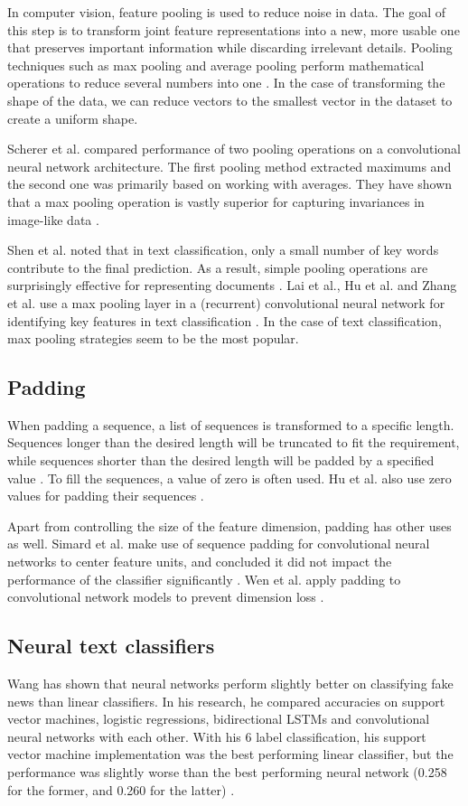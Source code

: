 In computer vision, feature pooling is used to reduce noise in data. 
The goal of this step is to transform joint feature representations into a new, more usable one that preserves important information while discarding irrelevant details. 
Pooling techniques such as max pooling and average pooling perform mathematical operations to reduce several numbers into one \cite{boureau2010}. 
In the case of transforming the shape of the data, we can reduce vectors to the smallest vector in the dataset to create a uniform shape.

Scherer et al. compared performance of two pooling operations on a convolutional neural network architecture. 
The first pooling method extracted maximums and the second one was primarily based on working with averages.
They have shown that a max pooling operation is vastly superior for capturing invariances in image-like data \cite{scherer2010}.

Shen et al. noted that in text classification, only a small number of key words contribute to the final prediction.
As a result, simple pooling operations are surprisingly effective for representing documents \cite{shen2018}.  
Lai et al., Hu et al. and Zhang et al. use a max pooling layer in a (recurrent) convolutional neural network for identifying key features in text classification \cite{lai2015}\cite{hu2014}\cite{zhang2015}. 
In the case of text classification, max pooling strategies seem to be the most popular. 

\subsection{Padding}
When padding a sequence, a list of sequences is transformed to a specific length. 
Sequences longer than the desired length will be truncated to fit the requirement, while sequences shorter than the desired length will be padded by a specified value \cite{keraspad}. 
To fill the sequences, a value of zero is often used. Hu et al. also use zero values for padding their sequences \cite{hu2014}. 

Apart from controlling the size of the feature dimension, padding has other uses as well. 
Simard et al. make use of sequence padding for convolutional neural networks to center feature units, and concluded it did not impact the performance of the classifier significantly \cite{simard2003}. 
Wen et al. apply padding to convolutional network models to prevent dimension loss \cite{wen2018}. 

\subsection{Neural text classifiers}
Wang has shown that neural networks perform slightly better on classifying fake news than linear classifiers. 
In his research, he compared accuracies on support vector machines, logistic regressions, bidirectional LSTMs and convolutional neural networks with each other.
With his 6 label classification, his support vector machine implementation was the best performing linear classifier, but the performance was slightly worse than the best performing neural network (0.258 for the former, and 0.260 for the latter) \cite{wang2018}.

